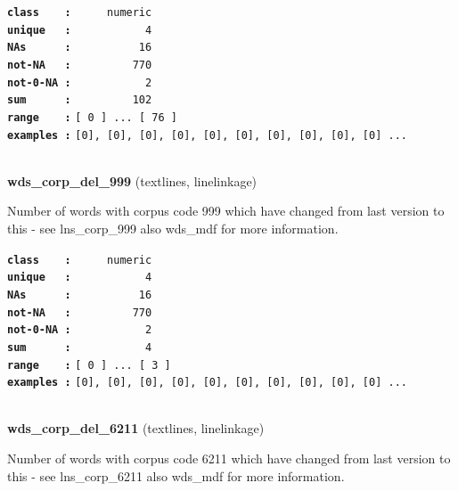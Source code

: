 \documentclass[]{article}
\begin{document}
\textbf{\texttt{class\ \ \ \ :}} \texttt{~~~~~numeric}\\
\textbf{\texttt{unique\ \ \ :}} \texttt{~~~~~~~~~~~4}\\
\textbf{\texttt{NAs\ \ \ \ \ \ :}} \texttt{~~~~~~~~~~16}\\
\textbf{\texttt{not-NA\ \ \ :}} \texttt{~~~~~~~~~770}\\
\textbf{\texttt{not-0-NA\ :}} \texttt{~~~~~~~~~~~2}\\
\textbf{\texttt{sum\ \ \ \ \ \ :}} \texttt{~~~~~~~~~102}\\
\textbf{\texttt{range\ \ \ \ :}}
\texttt{{[}\ 0\ {]}\ ...\ {[}\ 76\ {]}}\\
\textbf{\texttt{examples\ :}}
\texttt{{[}0{]},\ {[}0{]},\ {[}0{]},\ {[}0{]},\ {[}0{]},\ {[}0{]},\ {[}0{]},\ {[}0{]},\ {[}0{]},\ {[}0{]}\ ...}\\

~

\textbf{wds\_corp\_del\_999} (textlines, linelinkage)

Number of words with corpus code 999 which have changed from last
version to this - see lns\_corp\_999 also wds\_mdf for more information.

\textbf{\texttt{class\ \ \ \ :}} \texttt{~~~~~numeric}\\
\textbf{\texttt{unique\ \ \ :}} \texttt{~~~~~~~~~~~4}\\
\textbf{\texttt{NAs\ \ \ \ \ \ :}} \texttt{~~~~~~~~~~16}\\
\textbf{\texttt{not-NA\ \ \ :}} \texttt{~~~~~~~~~770}\\
\textbf{\texttt{not-0-NA\ :}} \texttt{~~~~~~~~~~~2}\\
\textbf{\texttt{sum\ \ \ \ \ \ :}} \texttt{~~~~~~~~~~~4}\\
\textbf{\texttt{range\ \ \ \ :}}
\texttt{{[}\ 0\ {]}\ ...\ {[}\ 3\ {]}}\\
\textbf{\texttt{examples\ :}}
\texttt{{[}0{]},\ {[}0{]},\ {[}0{]},\ {[}0{]},\ {[}0{]},\ {[}0{]},\ {[}0{]},\ {[}0{]},\ {[}0{]},\ {[}0{]}\ ...}\\

~

\textbf{wds\_corp\_del\_6211} (textlines, linelinkage)

Number of words with corpus code 6211 which have changed from last
version to this - see lns\_corp\_6211 also wds\_mdf for more
information.
\end{document}

